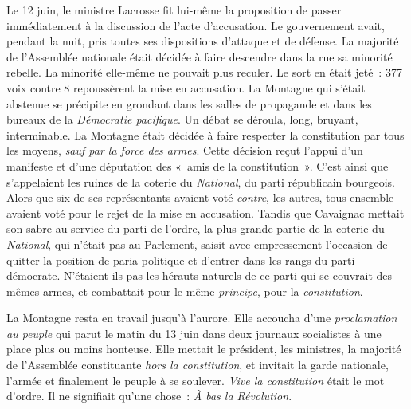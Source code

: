 \documentclass[french,twoside]{book} %
\begin{document}
Le 12 juin, le ministre Lacrosse fit lui-même la proposition de passer immédiatement à la discussion de l’acte d’accusation. Le gouvernement avait, pendant la nuit, pris toutes ses dispositions d’attaque et de défense. La majorité de l’Assemblée nationale était décidée à faire descendre dans la rue sa minorité rebelle. La minorité elle-même ne pouvait plus reculer. Le sort en était jeté : 377 voix contre 8 repoussèrent la mise en accusation. La Montagne qui s’était abstenue se précipite en grondant dans les salles de propagande et dans les bureaux de la \emph{Démocratie pacifique}. Un débat se déroula, long, bruyant, interminable. La Montagne était décidée à faire respecter la constitution par tous les moyens, \emph{sauf par la force des armes}. Cette décision reçut l’appui d’un manifeste et d’une députation des « amis de la constitution ». C’est ainsi que s’appelaient les ruines de la coterie du \emph{National}, du parti républicain bourgeois. Alors que six de ses représentants avaient voté \emph{contre}, les autres, tous ensemble avaient voté pour le rejet de la mise en accusation. Tandis que Cavaignac mettait son sabre au service du parti de l’ordre, la plus grande partie de la coterie du \emph{National}, qui n’était pas au Parlement, saisit avec empressement l’occasion de quitter la position de paria politique et d’entrer dans les rangs du parti démocrate. N’étaient-ils pas les hérauts naturels de ce parti qui se couvrait des mêmes armes, et combattait pour le même \emph{principe}, pour la \emph{constitution}.\par
La Montagne resta en travail jusqu’à l’aurore. Elle accoucha d’une \emph{proclamation au peuple} qui parut le matin du 13 juin dans deux journaux socialistes à une place plus ou moins honteuse. Elle mettait le président, les ministres, la majorité de l’Assemblée constituante \emph{hors la constitution}, et invitait la garde nationale, l’armée et finalement le peuple à se soulever. \emph{Vive la constitution} était le mot d’ordre. Il ne signifiait qu’une chose : \emph{À bas la Révolution}.\par
\end{document}
